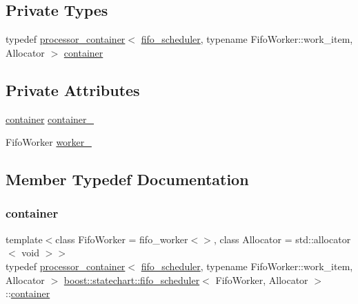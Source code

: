 \subsection*{Private Types}
\begin{DoxyCompactItemize}
\item 
typedef \mbox{\hyperlink{classboost_1_1statechart_1_1processor__container}{processor\+\_\+container}}$<$ \mbox{\hyperlink{classboost_1_1statechart_1_1fifo__scheduler}{fifo\+\_\+scheduler}}, typename Fifo\+Worker\+::work\+\_\+item, Allocator $>$ \mbox{\hyperlink{classboost_1_1statechart_1_1fifo__scheduler_a1bb1a46846b8c95208a1d2e0c364ac6e}{container}}
\end{DoxyCompactItemize}
\subsection*{Private Attributes}
\begin{DoxyCompactItemize}
\item 
\mbox{\hyperlink{classboost_1_1statechart_1_1fifo__scheduler_a1bb1a46846b8c95208a1d2e0c364ac6e}{container}} \mbox{\hyperlink{classboost_1_1statechart_1_1fifo__scheduler_a87fdd84b72a6fbea81eab725050c553a}{container\+\_\+}}
\item 
Fifo\+Worker \mbox{\hyperlink{classboost_1_1statechart_1_1fifo__scheduler_a6ff99598f5cdf7c170450a9ac100767b}{worker\+\_\+}}
\end{DoxyCompactItemize}


\subsection{Member Typedef Documentation}
\mbox{\label{classboost_1_1statechart_1_1fifo__scheduler_a1bb1a46846b8c95208a1d2e0c364ac6e}} 
\subsubsection{\texorpdfstring{container}{container}}
{\footnotesize\ttfamily template$<$class Fifo\+Worker = fifo\+\_\+worker$<$$>$, class Allocator = std\+::allocator$<$ void $>$$>$ \\
typedef \mbox{\hyperlink{classboost_1_1statechart_1_1processor__container}{processor\+\_\+container}}$<$ \mbox{\hyperlink{classboost_1_1statechart_1_1fifo__scheduler}{fifo\+\_\+scheduler}}, typename Fifo\+Worker\+::work\+\_\+item, Allocator $>$ \mbox{\hyperlink{classboost_1_1statechart_1_1fifo__scheduler}{boost\+::statechart\+::fifo\+\_\+scheduler}}$<$ Fifo\+Worker, Allocator $>$\+::\mbox{\hyperlink{classboost_1_1statechart_1_1fifo__scheduler_a1bb1a46846b8c95208a1d2e0c364ac6e}{container}}\hspace{0.3cm}{\ttfamily [private]}}

